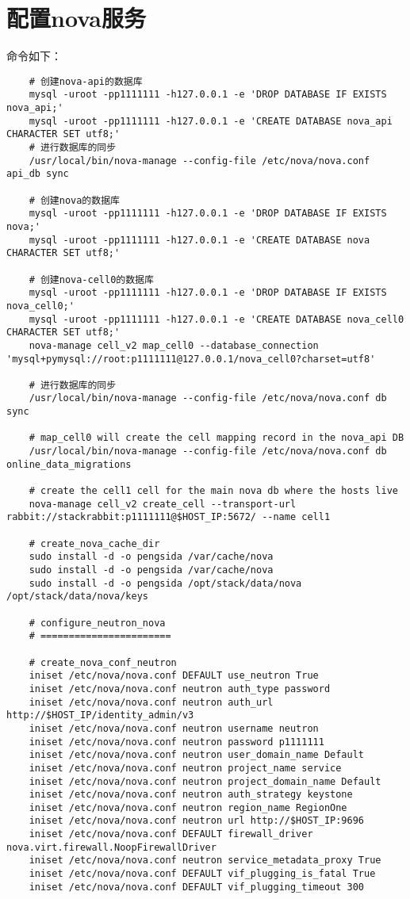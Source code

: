 \documentclass[a4paper,left=1.5cm,right=1.5cm,11pt]{article}
\begin{document}
\section{配置nova服务}
	命令如下：
	\begin{lstlisting}
	# 创建nova-api的数据库
	mysql -uroot -pp1111111 -h127.0.0.1 -e 'DROP DATABASE IF EXISTS nova_api;'
	mysql -uroot -pp1111111 -h127.0.0.1 -e 'CREATE DATABASE nova_api CHARACTER SET utf8;'
	# 进行数据库的同步
	/usr/local/bin/nova-manage --config-file /etc/nova/nova.conf api_db sync
	
	# 创建nova的数据库	
	mysql -uroot -pp1111111 -h127.0.0.1 -e 'DROP DATABASE IF EXISTS nova;'
	mysql -uroot -pp1111111 -h127.0.0.1 -e 'CREATE DATABASE nova CHARACTER SET utf8;'

	# 创建nova-cell0的数据库	
	mysql -uroot -pp1111111 -h127.0.0.1 -e 'DROP DATABASE IF EXISTS nova_cell0;'
	mysql -uroot -pp1111111 -h127.0.0.1 -e 'CREATE DATABASE nova_cell0 CHARACTER SET utf8;'
	nova-manage cell_v2 map_cell0 --database_connection 'mysql+pymysql://root:p1111111@127.0.0.1/nova_cell0?charset=utf8'
	
	# 进行数据库的同步
	/usr/local/bin/nova-manage --config-file /etc/nova/nova.conf db sync

	# map_cell0 will create the cell mapping record in the nova_api DB
	/usr/local/bin/nova-manage --config-file /etc/nova/nova.conf db online_data_migrations
	
	# create the cell1 cell for the main nova db where the hosts live
	nova-manage cell_v2 create_cell --transport-url rabbit://stackrabbit:p1111111@$HOST_IP:5672/ --name cell1

	# create_nova_cache_dir
	sudo install -d -o pengsida /var/cache/nova
	sudo install -d -o pengsida /var/cache/nova
	sudo install -d -o pengsida /opt/stack/data/nova /opt/stack/data/nova/keys
	
	# configure_neutron_nova
	# =======================

	# create_nova_conf_neutron
	iniset /etc/nova/nova.conf DEFAULT use_neutron True
	iniset /etc/nova/nova.conf neutron auth_type password
	iniset /etc/nova/nova.conf neutron auth_url http://$HOST_IP/identity_admin/v3
	iniset /etc/nova/nova.conf neutron username neutron
	iniset /etc/nova/nova.conf neutron password p1111111
	iniset /etc/nova/nova.conf neutron user_domain_name Default
	iniset /etc/nova/nova.conf neutron project_name service
	iniset /etc/nova/nova.conf neutron project_domain_name Default
	iniset /etc/nova/nova.conf neutron auth_strategy keystone
	iniset /etc/nova/nova.conf neutron region_name RegionOne
	iniset /etc/nova/nova.conf neutron url http://$HOST_IP:9696
	iniset /etc/nova/nova.conf DEFAULT firewall_driver nova.virt.firewall.NoopFirewallDriver
	iniset /etc/nova/nova.conf neutron service_metadata_proxy True
	iniset /etc/nova/nova.conf DEFAULT vif_plugging_is_fatal True
	iniset /etc/nova/nova.conf DEFAULT vif_plugging_timeout 300
	\end{lstlisting}
\end{document}
